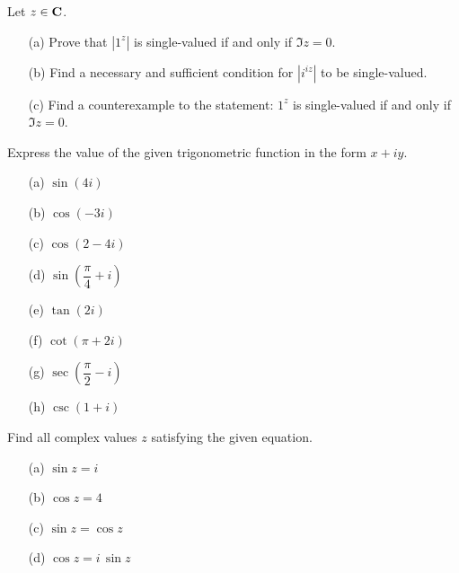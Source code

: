 \vspace{0.1in}

\begin{problem}\label{prob 10.5}
Let $z \in \mathbf C$.
\begin{itemize}
\item[(a)] Prove that $|1^{z}|$ is single-valued if and only if $\Im z = 0$.
\item[(b)] Find a necessary and sufficient condition for $|i^{iz}|$ to be single-valued.
\item[(c)] Find a counterexample to the statement: $1^z$ is single-valued if and only if $\Im z = 0$.
\end{itemize}
\end{problem}

\vspace{0.1in}

\begin{problem}\label{prob 10.6}
Express the value of the given trigonometric function in the form $x + iy$.
\begin{multicols}{2}
\begin{itemize}
\item[(a)] $\sin(4i)$
\item[(b)] $\cos(-3i)$
\item[(c)] $\cos(2-4i)$
\item[(d)] $\sin\left(\dfrac{\pi}{4} + i\right)$
\item[(e)] $\tan(2i)$
\item[(f)] $\cot(\pi + 2i)$
\item[(g)] $\sec\left(\dfrac{\pi}{2} - i\right)$
\item[(h)] $\csc(1 + i)$
\end{itemize}
\end{multicols}
\end{problem}

\vspace{0.1in}

\begin{problem}\label{prob 10.7}
Find all complex values $z$ satisfying the given equation.
\begin{multicols}{2}
\begin{itemize}
\item[(a)] $\sin z = i$
\item[(b)] $\cos z = 4$
\item[(c)] $\sin z = \cos z$
\item[(d)] $\cos z = i\,\sin z$
\end{itemize}
\end{multicols}
\end{problem}


